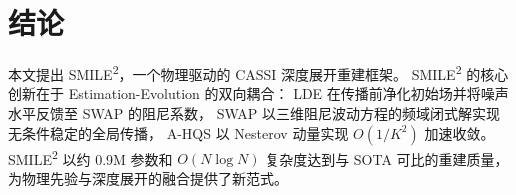 \documentclass[a4paper,11pt,twocolumn]{ctexart}
\newcommand{\smiletwo}{SMILE\textsuperscript{2}}
\newcommand{\swap}{\textsc{SWAP}}
\newcommand{\lde}{\textsc{LDE}}
\newcommand{\ahqs}{\textsc{A-HQS}}
\begin{document}
\section{结论}\label{sec:conclusion}

本文提出 \smiletwo{}，一个物理驱动的 CASSI 深度展开重建框架。
\smiletwo{} 的核心创新在于 Estimation-Evolution 的双向耦合：
\lde{} 在传播前净化初始场并将噪声水平反馈至 \swap{} 的阻尼系数，
\swap{} 以三维阻尼波动方程的频域闭式解实现无条件稳定的全局传播，
\ahqs{} 以 Nesterov 动量实现 $O(1/K^2)$ 加速收敛。
\smiletwo{} 以约 0.9M 参数和 $O(N\log N)$ 复杂度达到与 SOTA 可比的重建质量，
为物理先验与深度展开的融合提供了新范式。



\end{document}
